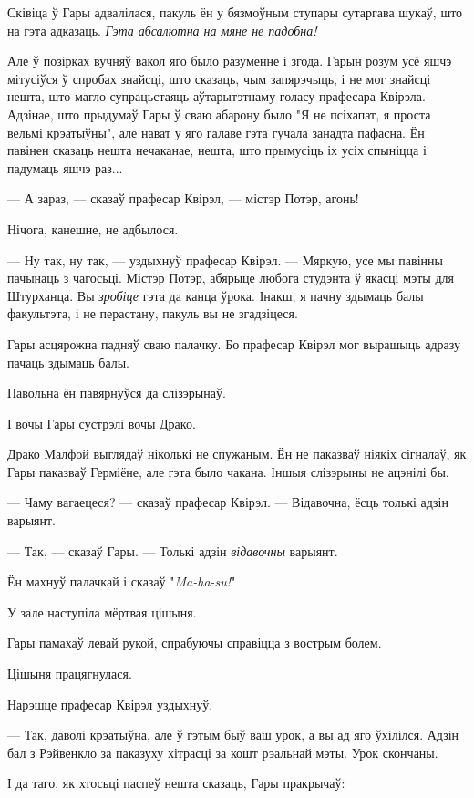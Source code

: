 Сківіца ў Гары адвалілася, пакуль ён у бязмоўным ступары сутаргава шукаў, што 
на гэта адказаць. \emph{Гэта абсалютна на мяне не падобна!}

Але ў позірках вучняў вакол яго было разуменне і згода. Гарын розум усё яшчэ 
мітусіўся ў спробах знайсці, што сказаць, чым запярэчыць, і не мог 
знайсці нешта, што магло супрацьстаяць аўтарытэтнаму голасу прафесара Квірэла.
Адзінае, што прыдумаў Гары ў сваю абарону было "Я не псіхапат, я проста вельмі
крэатыўны", але нават у яго галаве гэта гучала занадта пафасна. Ён павінен сказаць 
нешта нечаканае, нешта, што прымусіць іх усіх спыніцца і падумаць яшчэ раз...

--- А зараз, --- сказаў прафесар Квірэл, --- містэр Потэр, агонь!

Нічога, канешне, не адбылося.

--- Ну так, ну так, --- уздыхнуў прафесар Квірэл. --- Мяркую, усе мы павінны 
пачынаць з чагосьці. Містэр Потэр, абярыце любога студэнта ў якасці мэты для 
Штурханца. Вы \emph{зробіце} гэта да канца ўрока. Інакш, я пачну здымаць 
балы факультэта, і не перастану, пакуль вы не згадзіцеся. 

Гары асцярожна падняў сваю палачку. Бо прафесар Квірэл мог вырашыць адразу пачаць здымаць 
балы.

Павольна ён павярнуўся да слізэрынаў. 

І вочы Гары сустрэлі вочы Драко.

Драко Малфой выглядаў ніколькі не спужаным. Ён не паказваў ніякіх сігналаў, 
як Гары паказваў Герміёне, але гэта было чакана. Іншыя слізэрыны не ацэнілі бы.

--- Чаму вагаецеся? --- сказаў прафесар Квірэл. --- Відавочна, ёсць толькі адзін 
варыянт. 

--- Так, --- сказаў Гары. --- Толькі адзін \emph{відавочны} варыянт.

Ён махнуў палачкай і сказаў "\emph{Ma-ha-su!}"

У зале наступіла мёртвая цішыня. 

Гары памахаў левай рукой, спрабуючы справіцца з вострым болем.

Цішыня працягнулася.

Нарэшце прафесар Квірэл уздыхнуў. 

--- Так, даволі крэатыўна, але ў гэтым быў ваш урок, а вы ад яго ўхілілся.
Адзін бал з Рэйвенкло за паказуху хітрасці за кошт рэальнай мэты. 
Урок скончаны.

І да таго, як хтосьці паспеў нешта сказаць, Гары пракрычаў:

